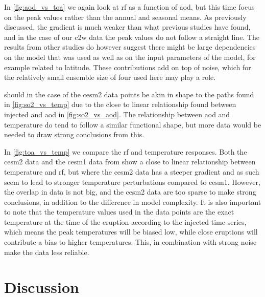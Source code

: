 \documentclass{ametsocV5}
\newcommand{\iso}[1][i]{{#1}njected \ce{SO2}}
\begin{document}
In \cref{fig:aod_vs_toa} we again look at \ac{rf} as a function of \ac{aod}, but this
time focus on the peak values rather than the annual and seasonal means. As previously
discussed, the gradient is much weaker than what previous studies have found, and in the
case of our \ac{c2w} data the peak values do not follow a straight line. The results
from other studies \citep{jones2005, ottobliesner2016, timmreck2010} do however suggest
there might be large dependencies on the model that was used as well as on the input
parameters of the model, for example related to latitude. These contributions add on top
of noise, which for the relatively small ensemble size of four used here may play a
role.

 should in the case of the \ac{cesm2} data points be akin in shape
to the paths found in \cref{fig:so2_vs_temp} due to the close to linear relationship
found between \iso{} and \ac{aod} in \cref{fig:so2_vs_aod}. The relationship between
\ac{aod} and temperature do tend to follow a similar functional shape, but more data
would be needed to draw strong conclusions from this.

In \cref{fig:toa_vs_temp} we compare the \ac{rf} and temperature responses. Both the
\ac{cesm2} data and the \ac{cesm1} data from \citet{ottobliesner2016} show a close to
linear relationship between temperature and \ac{rf}, but where the \ac{cesm2} data has a
steeper gradient and as such seem to lead to stronger temperature perturbations compared
to \ac{cesm1}. However, the overlap in data is not big, and the \ac{cesm2} data are too
sparse to make strong conclusions, in addition to the difference in model complexity. It
is also important to note that the temperature values used in the
\citet{ottobliesner2016} data points are the exact temperature at the time of the
eruption according to the \iso{} time series, which means the peak temperatures will be
biased low, while close eruptions will contribute a bias to higher temperatures. This,
in combination with strong noise make the data less reliable.

\section{Discussion}\label{sec:discussion}

\end{document}
